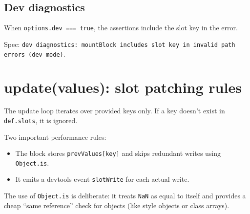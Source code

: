 \subsection{Dev diagnostics}

When \texttt{options.dev === true}, the assertions include the slot key in the error.

Spec: \texttt{dev diagnostics: mountBlock includes slot key in invalid path errors (dev mode)}.

\section{update(values): slot patching rules}

\begin{center}
\end{center}

The update loop iterates over provided keys only. If a key doesn’t exist in \texttt{def.slots}, it is ignored.

Two important performance rules:

\begin{itemize}
  \item The block stores \texttt{prevValues[key]} and skips redundant writes using \texttt{Object.is}.
  \item It emits a devtools event \texttt{slotWrite} for each actual write.
\end{itemize}

The use of \texttt{Object.is} is deliberate: it treats \texttt{NaN} as equal to itself and provides a cheap “same reference” check for objects (like style objects or class arrays).

